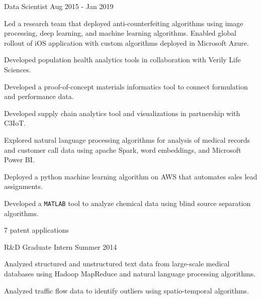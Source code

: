 \begin{cventries}
  \cventry
    {Data Scientist} %
    {} %
    {} %
    {Aug 2015 - Jan 2019} %
    {
      \begin{cvitems} %
        \item {Led a research team that deployed anti-counterfeiting algorithms using image
          processing, deep learning, and machine learning algorithms. Enabled global
          rollout of iOS application with custom algorithms deployed in Microsoft Azure.}
        \item {Developed population health analytics tools in collaboration with Verily 
            Life Sciences.}
        \item {Developed a proof-of-concept materials informatics tool to connect
            formulation and performance data.}
        \item {Developed supply chain analytics tool and visualizations in partnership
            with C3IoT.}
        \item {Explored natural language processing algorithms for analysis of medical
            records and customer call data using apache Spark, word embeddings, and
            Microsoft Power BI.}
        \item {Deployed a python machine learning algorithm on AWS that automates sales
            lead assignments.}
        \item {Developed a {\texttt{MATLAB}} tool to analyze chemical data using blind source
            separation algorithms.}
        \item {7 patent applications}
      \end{cvitems}
    }

  \cventry
    {R\&D Graduate Intern} %
    {} %
    {} %
    {Summer 2014} %
    {
      \begin{cvitems} %
      \item {Analyzed structured and unstructured text data from large-scale medical
        databases using Hadoop MapReduce and natural language processing
        algorithms.}
      \item {Analyzed traffic flow data to identify outliers using spatio-temporal
        algorithms.}
      \end{cvitems}
    }


\end{cventries}
